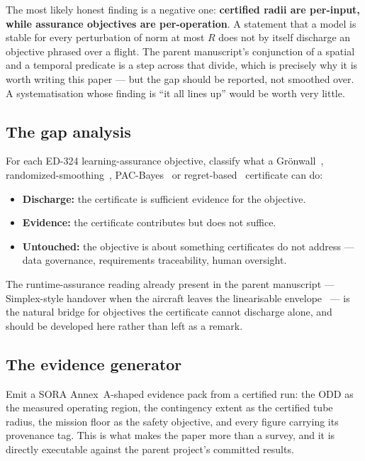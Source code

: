 \documentclass[11pt,a4paper]{article}
\begin{document}
\begin{honestly}
The most likely honest finding is a negative one: \textbf{certified radii are
per-input, while assurance objectives are per-operation}. A statement that a
model is stable for every perturbation of norm at most $R$ does not by itself
discharge an objective phrased over a flight. The parent manuscript's
conjunction of a spatial and a temporal predicate is a step across that divide,
which is precisely why it is worth writing this paper --- but the gap should be
reported, not smoothed over. A systematisation whose finding is ``it all lines
up'' would be worth very little.
\end{honestly}

\subsection{The gap analysis}
For each ED-324 learning-assurance objective, classify what a
Gr\"onwall~\cite{gronwall1919}, randomized-smoothing~\cite{cohen2019smoothing},
PAC-Bayes~\cite{mcallester1999pac} or regret-based~\cite{arora2012mwu}
certificate can do:

\begin{itemize}
\item \textbf{Discharge:} the certificate is sufficient evidence for the
objective.
\item \textbf{Evidence:} the certificate contributes but does not suffice.
\item \textbf{Untouched:} the objective is about something certificates do not
address --- data governance, requirements traceability, human oversight.
\end{itemize}

The runtime-assurance reading already present in the parent manuscript ---
Simplex-style handover when the aircraft leaves the linearisable
envelope~\cite{sha2001simplex} --- is the natural bridge for objectives the
certificate cannot discharge alone, and should be developed here rather than
left as a remark.

\subsection{The evidence generator}
Emit a SORA Annex~A-shaped evidence pack from a certified run: the ODD as the
measured operating region, the contingency extent as the certified tube radius,
the mission floor as the safety objective, and every figure carrying its
provenance tag. This is what makes the paper more than a survey, and it is
directly executable against the parent project's committed results.
\end{document}
